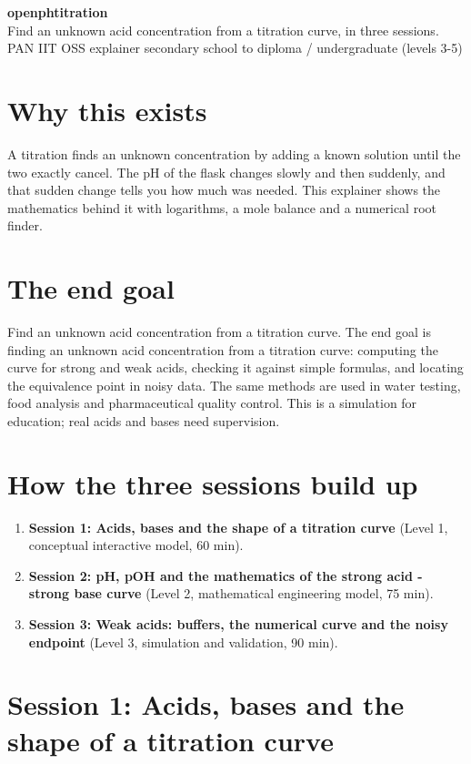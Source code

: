 \documentclass[11pt,a4paper]{article}
\begin{document}
\begin{center}{\LARGE\bfseries openphtitration}\\[0.4em]{\large Find an unknown acid concentration from a titration curve, in three sessions.}\\[0.2em]\small PAN IIT OSS explainer \textbullet{} secondary school to diploma / undergraduate (levels 3-5)\end{center}

\section*{Why this exists}
A titration finds an unknown concentration by adding a known solution until the two exactly cancel. The pH of the flask changes slowly and then suddenly, and that sudden change tells you how much was needed. This explainer shows the mathematics behind it with logarithms, a mole balance and a numerical root finder.

\section*{The end goal}
Find an unknown acid concentration from a titration curve. The end goal is finding an unknown acid concentration from a titration curve: computing the curve for strong and weak acids, checking it against simple formulas, and locating the equivalence point in noisy data. The same methods are used in water testing, food analysis and pharmaceutical quality control. This is a simulation for education; real acids and bases need supervision.

\section*{How the three sessions build up}
\begin{enumerate}[nosep]
\item \textbf{Session 1: Acids, bases and the shape of a titration curve} (Level 1, conceptual interactive model, 60 min).
\item \textbf{Session 2: pH, pOH and the mathematics of the strong acid - strong base curve} (Level 2, mathematical engineering model, 75 min).
\item \textbf{Session 3: Weak acids: buffers, the numerical curve and the noisy endpoint} (Level 3, simulation and validation, 90 min).
\end{enumerate}

\section{Session 1: Acids, bases and the shape of a titration curve}
\end{document}
